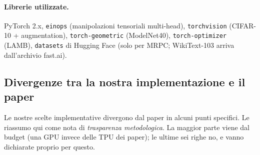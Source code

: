 \documentclass[
  11pt,
]{article}
\begin{document}
\paragraph{Librerie utilizzate.} PyTorch 2.x, \texttt{einops} (manipolazioni tensoriali multi-head), \texttt{torchvision} (CIFAR-10 + augmentation), \texttt{torch-geometric} (ModelNet40), \texttt{torch-optimizer} (LAMB), \texttt{datasets} di Hugging Face (solo per MRPC; WikiText-103 arriva dall'archivio fast.ai).

\subsection{Divergenze tra la nostra implementazione e il paper}
\label{sec:progetto-divergenze}

Le nostre scelte implementative divergono dal paper in alcuni punti specifici. Le riassumo qui come nota di \emph{trasparenza metodologica}. La maggior parte viene dal budget (una GPU invece delle TPU dei paper); le ultime sei righe no, e vanno dichiarate proprio per questo.
\end{document}

